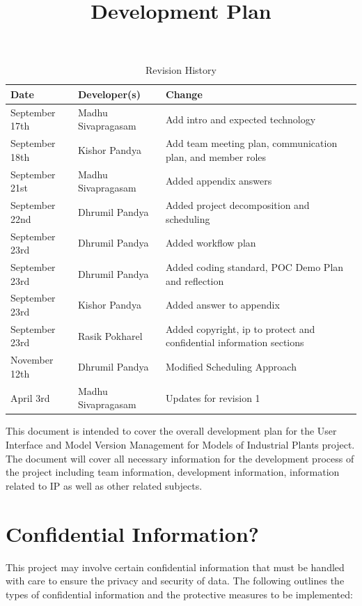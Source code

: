 \documentclass{article}
\title{Development Plan\\\progname}
\author{\authname}
\date{}
\begin{document}
\maketitle

\begin{table}[hp]
\caption{Revision History} \label{TblRevisionHistory}
\begin{tabularx}{\textwidth}{llX}
\toprule
\textbf{Date} & \textbf{Developer(s)} & \textbf{Change}\\
\midrule
September 17th & Madhu Sivapragasam & Add intro and expected technology\\
September 18th & Kishor Pandya & Add team meeting plan, communication plan, and member roles\\
September 21st & Madhu Sivapragasam & Added appendix answers\\
September 22nd & Dhrumil Pandya & Added project decomposition and scheduling\\
September 23rd & Dhrumil Pandya & Added workflow plan\\
September 23rd & Dhrumil Pandya & Added coding standard, POC Demo Plan and reflection \\
September 23rd & Kishor Pandya & Added answer to appendix\\
September 23rd & Rasik Pokharel & Added copyright, ip to protect and confidential information sections \\ 
November 12th & Dhrumil Pandya & Modified Scheduling Approach\\
April 3rd & Madhu Sivapragasam & Updates for revision 1\\
\bottomrule
\end{tabularx}
\end{table}

\newpage{}

This document is intended to cover the overall development plan for the User Interface and Model Version Management for Models of Industrial Plants project. The document will cover all necessary information for the development process of the project including team information, development information, information related to IP as well as other related subjects. 

\section{Confidential Information?}

This project may involve certain confidential information that must be handled with care to ensure the privacy and security of data. The following outlines the types of confidential information and the protective measures to be implemented:
\end{document}
